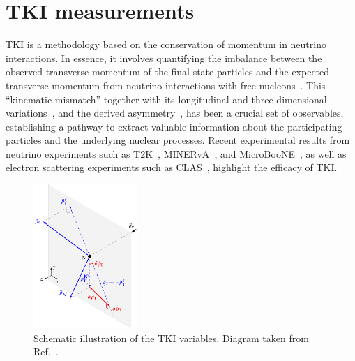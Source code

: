 \section{TKI measurements}\label{sec:tki}


TKI is a methodology based on the conservation of momentum in neutrino interactions. In essence, it involves quantifying the imbalance between the observed transverse momentum of the final-state particles and the expected transverse momentum from neutrino interactions with free nucleons~\cite{Lu:2015hea, Lu:2015tcr}. This ``kinematic mismatch'' together with its longitudinal and three-dimensional variations~\cite{Furmanski:2016wqo, Lu:2019nmf}, and the derived asymmetry~\cite{Cai:2019jzk}, has been a crucial set of observables, establishing a pathway to extract valuable information about the participating particles and the underlying nuclear processes. Recent experimental results from neutrino experiments such as  T2K~\cite{T2K:2018rnz, T2K:2021naz}, MINERvA~\cite{MINERvA:2018hba, MINERvA:2019ope, MINERvA:2020anu, MINERvA:2021csy}, and MicroBooNE~\cite{MicroBooNE:2022emb, MicroBooNE:2023cmw, MicroBooNE:2023tzj, MicroBooNE:2023wzy, MicroBooNE:2024tmp}, as well as electron scattering experiments such as  CLAS~\cite{CLAS:2021neh}, highlight the efficacy of TKI. 

\begin{figure}[!htb] 	
    \centering 		
    \includegraphics[width=0.35\textwidth]{figures/stki.eps}
    \caption{\label{fig:stki} Schematic illustration of the TKI variables. Diagram taken from Ref.~\cite{Lu:2015tcr}.} 
\end{figure}

